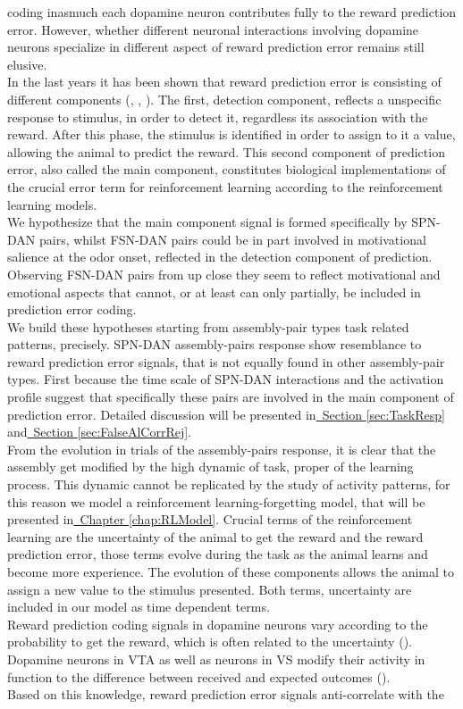 {coding inasmuch each dopamine neuron contributes fully to the reward prediction error. However, whether different neuronal interactions involving dopamine neurons specialize in different aspect of reward prediction error remains still elusive.\\In the last years it has been shown that reward prediction error is consisting of different components (\cite{Nomoto2010}, \cite{Fiorillo2013b}, \cite{Schultz2016}). The first, detection component, reflects a unspecific response to stimulus, in order to detect it, regardless its association with the reward. After this phase, the stimulus is identified in order to assign to it a value, allowing the animal to predict the reward. This second component of prediction error, also called the main component, constitutes biological implementations of the crucial error term for reinforcement learning according to the reinforcement learning models.\\We hypothesize that the main component signal is formed specifically by SPN-DAN pairs, whilst FSN-DAN pairs could be in part involved in motivational salience at the odor onset, reflected in the detection component of prediction. Observing FSN-DAN pairs from up close they seem to reflect motivational and emotional aspects that cannot, or at least can only partially, be included in prediction error coding.\\We build these hypotheses starting from assembly-pair types task related patterns, precisely. SPN-DAN assembly-pairs response show resemblance to reward prediction error signals, that is not equally found in other assembly-pair types. First because the time scale of SPN-DAN interactions and the activation profile suggest that specifically these pairs are involved in the main component of prediction error. Detailed discussion will be presented in\hyperref[sec:TaskResp]{~Section \ref*{sec:TaskResp}} and\hyperref[sec:FalseAlCorrRej]{~Section \ref*{sec:FalseAlCorrRej}}.\\From the evolution in trials of the assembly-pairs response, it is clear that the assembly get modified by the high dynamic of task, proper of the learning process. This dynamic cannot be replicated by the study of activity patterns, for this reason we model a reinforcement learning-forgetting model, that will be presented in\hyperref[chap:RLModel]{~Chapter \ref*{chap:RLModel}}. Crucial terms of the reinforcement learning are the uncertainty of the animal to get the reward and the reward prediction error, those terms evolve during the task as the animal learns and become more experience. The evolution of these components allows the animal to assign a new value to the stimulus presented. Both terms, uncertainty are included in our model as time dependent terms.\\Reward prediction coding signals in dopamine neurons vary according to the probability to get the reward, which is often related to the uncertainty (\cite{Schultz1992}). Dopamine neurons in VTA as well as neurons in VS modify their activity in function to the difference between received and expected outcomes (\cite{Fiorillo}).\\Based on this knowledge, reward prediction error signals anti-correlate with the }
